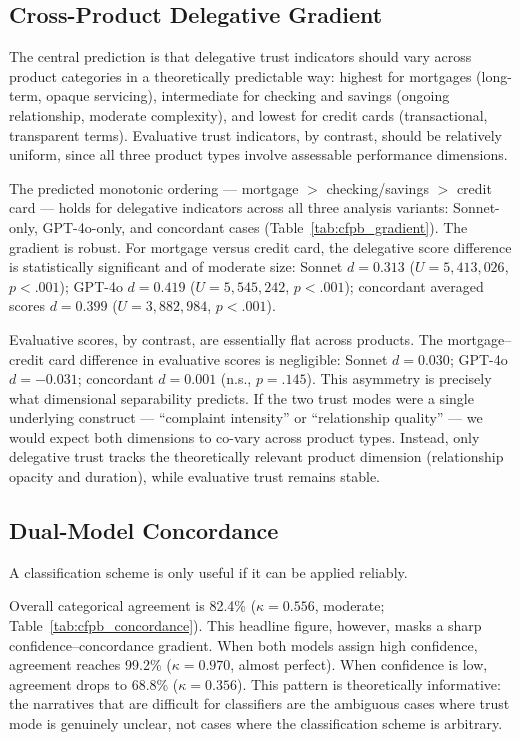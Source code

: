 \subsection{Cross-Product Delegative Gradient}

The central prediction is that delegative trust indicators should vary across product categories in a theoretically predictable way: highest for mortgages (long-term, opaque servicing), intermediate for checking and savings (ongoing relationship, moderate complexity), and lowest for credit cards (transactional, transparent terms). Evaluative trust indicators, by contrast, should be relatively uniform, since all three product types involve assessable performance dimensions.



The predicted monotonic ordering --- mortgage $>$ checking/savings $>$ credit card --- holds for delegative indicators across all three analysis variants: Sonnet-only, GPT-4o-only, and concordant cases (Table~\ref{tab:cfpb_gradient}). The gradient is robust. For mortgage versus credit card, the delegative score difference is statistically significant and of moderate size: Sonnet $d = 0.313$ ($U = 5{,}413{,}026$, $p < .001$); GPT-4o $d = 0.419$ ($U = 5{,}545{,}242$, $p < .001$); concordant averaged scores $d = 0.399$ ($U = 3{,}882{,}984$, $p < .001$).

Evaluative scores, by contrast, are essentially flat across products. The mortgage--credit card difference in evaluative scores is negligible: Sonnet $d = 0.030$; GPT-4o $d = -0.031$; concordant $d = 0.001$ (n.s., $p = .145$). This asymmetry is precisely what dimensional separability predicts. If the two trust modes were a single underlying construct --- ``complaint intensity'' or ``relationship quality'' --- we would expect both dimensions to co-vary across product types. Instead, only delegative trust tracks the theoretically relevant product dimension (relationship opacity and duration), while evaluative trust remains stable.

\subsection{Dual-Model Concordance}

A classification scheme is only useful if it can be applied reliably.



Overall categorical agreement is 82.4\% ($\kappa = 0.556$, moderate; Table~\ref{tab:cfpb_concordance}). This headline figure, however, masks a sharp confidence--concordance gradient. When both models assign high confidence, agreement reaches 99.2\% ($\kappa = 0.970$, almost perfect). When confidence is low, agreement drops to 68.8\% ($\kappa = 0.356$). This pattern is theoretically informative: the narratives that are difficult for classifiers are the ambiguous cases where trust mode is genuinely unclear, not cases where the classification scheme is arbitrary.

